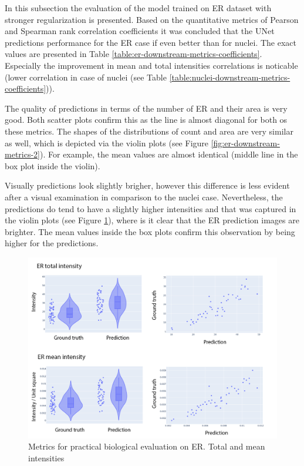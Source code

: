 In this subsection the evaluation of the model trained on ER dataset with stronger regularization is presented. Based on the quantitative metrics of Pearson and Spearman rank correlation coefficients it was concluded that the UNet predictions performance for the ER case if even better than for nuclei. The exact values are presented in Table \ref{table:er-downstream-metrics-coefficients}. Especially the improvement in mean and total intensities correlations is noticable (lower correlation in case of nuclei (see Table \ref{table:nuclei-downstream-metrics-coefficients})). 

The quality of predictions in terms of the number of ER and their area is very good. Both scatter plots confirm this as the line is almost diagonal for both os these metrics. The shapes of the distributions of count and area are very similar as well, which is depicted via the violin plots (see Figure \ref{fig:er-downstream-metrics-2}). For example, the mean values are almost identical (middle line in the box plot inside the violin). 

Visually predictions look slightly brigher, however this difference is less evident after a visual examination in comparison to the nuclei case. Nevertheless, the predictions do tend to have a slightly higher intensities and that was captured in the violin plots (see Figure \ref{fig:er-downstream-metrics-1}), where is it clear that the ER prediction images are brighter. The mean values inside the box plots confirm this observation by being higher for the predictions.

\begin{figure}[htb]
	\begin{center}
		\includegraphics[width=0.8\linewidth]{bilder/ER/metrics/combined-metrics-1.png}
		\caption{Metrics for practical biological evaluation on ER. Total and mean intensities}\label{fig:er-downstream-metrics-1}
	\end{center}
\end{figure}


